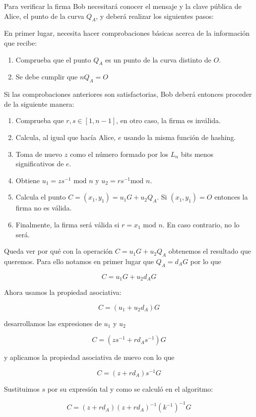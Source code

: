 \documentclass{article}
\begin{document}
Para verificar la firma Bob necesitará conocer el mensaje y la clave
pública de Alice, el punto de la curva $Q_A$, y deberá realizar los
siguientes pasos:

En primer lugar, necesita hacer comprobaciones básicas acerca de la
información que recibe:

\begin{enumerate}
\item Comprueba que el punto $Q_A$ es un punto de la curva distinto
de $O$.
\item Se debe cumplir que $nQ_A=O$
\end{enumerate}

Si las comprobaciones anteriores son satisfactorias, Bob deberá
entonces proceder de la siguiente manera:

\begin{enumerate}
\item Comprueba que $r,s\in[1, n-1]$, en otro caso, la firma es
inválida.
\item Calcula, al igual que hacía Alice, $e$ usando la misma
función de hashing.
\item Toma de nuevo $z$ como el número formado por los $L_n$ bits menos significativos de $e$.
\item Obtiene $u_1 = zs^{-1} \text{ mod } n$ y $u_2 = rs^{-1} \text{
mod } n$.
\item Calcula el punto $C = (x_1,y_1)=u_1G+u_2Q_A$. Si $(x_1,
y_1)=O$ entonces la firma no es válida.
\item Finalmente, la firma será válida si $r= x_1 \text{ mod }
n$. En caso contrario, no lo será.
\end{enumerate}

Queda ver por qué con la operación $C=u_1G+u_2Q_A$ obtenemos el
resultado que queremos. Para ello notamos en primer lugar que
$Q_A=d_AG$ por lo que

\[ C=u_1G+u_2d_AG
\]

Ahora usamos la propiedad asociativa:

\[ C = (u_1+u_2d_A)G
\]

desarrollamos las expresiones de $u_1$ y $u_2$

\[ C = (zs^{-1}+rd_As^{-1})G
\]

y aplicamos la propiedad asociativa de nuevo con lo que

\[ C = (z+rd_A)s^{-1}G
\]

Sustituimos $s$ por su expresión tal y como se calculó en el
algoritmo:

\[ C = (z+rd_A)(z+rd_A)^{-1}(k^{-1})^{-1}G
\]
\end{document}
